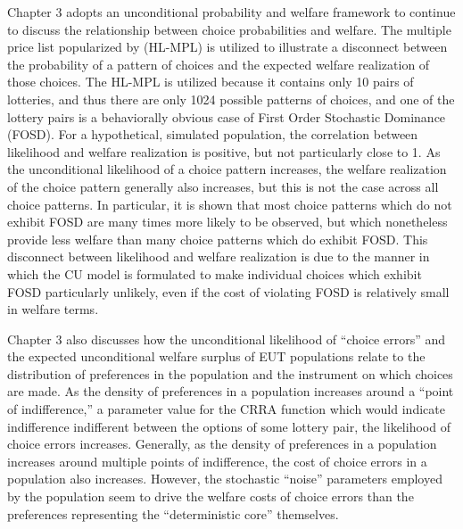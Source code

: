 \documentclass[../main.tex]{subfiles}
\begin{document}
Chapter 3 adopts an unconditional probability and welfare framework to continue to discuss the relationship between choice probabilities and welfare.
The multiple price list popularized by \textcite{Holt2002} (HL-MPL) is utilized to illustrate a disconnect between the probability of a pattern of choices and the expected welfare realization of those choices.
The HL-MPL is utilized because it contains only 10 pairs of lotteries, and thus there are only 1024 possible patterns of choices, and one of the lottery pairs is a behaviorally obvious case of First Order Stochastic Dominance (FOSD).
For a hypothetical, simulated population, the correlation between likelihood and welfare realization is positive, but not particularly close to 1.
As the unconditional likelihood of a choice pattern increases, the welfare realization of the choice pattern generally also increases, but this is not the case across all choice patterns.
In particular, it is shown that most choice patterns which do not exhibit FOSD are many times more likely to be observed, but which nonetheless provide less welfare than many choice patterns which do exhibit FOSD.
This disconnect between likelihood and welfare realization is due to the manner in which the CU model is formulated to make individual choices which exhibit FOSD particularly unlikely, even if the cost of violating FOSD is relatively small in welfare terms.

Chapter 3 also discusses how the unconditional likelihood of \enquote{choice errors} and the expected unconditional welfare surplus of EUT populations relate to the distribution of preferences in the population and the instrument on which choices are made.
As the density of preferences in a population increases around a \enquote{point of indifference,} a parameter value for the CRRA function which would indicate indifference indifferent between the options of some lottery pair, the likelihood of choice errors increases.
Generally, as the density of preferences in a population increases around multiple points of indifference, the cost of choice errors in a population also increases.
However, the stochastic \enquote{noise} parameters employed by the population seem to drive the welfare costs of choice errors than the preferences representing the \enquote{deterministic core} themselves.
\end{document}
